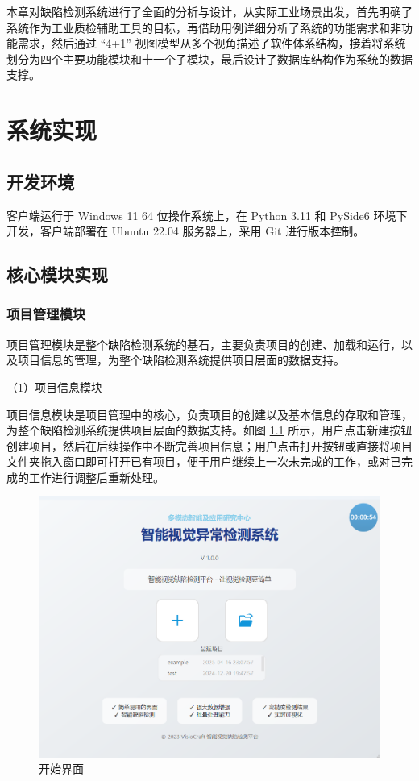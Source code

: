 \documentclass[
  ]{njuthesis}
\begin{document}
本章对缺陷检测系统进行了全面的分析与设计，从实际工业场景出发，首先明确了系统作为工业质检辅助工具的目标，再借助用例详细分析了系统的功能需求和非功能需求，然后通过 “4+1” 视图模型从多个视角描述了软件体系结构，接着将系统划分为四个主要功能模块和十一个子模块，最后设计了数据库结构作为系统的数据支撑。

\chapter{系统实现}

\section{开发环境}

客户端运行于 Windows 11 64 位操作系统上，在 Python 3.11 和 PySide6 环境下开发，客户端部署在 Ubuntu 22.04 服务器上，采用 Git 进行版本控制。

\section{核心模块实现}

\subsection{项目管理模块}

项目管理模块是整个缺陷检测系统的基石，主要负责项目的创建、加载和运行，以及项目信息的管理，为整个缺陷检测系统提供项目层面的数据支持。

（1）项目信息模块

项目信息模块是项目管理中的核心，负责项目的创建以及基本信息的存取和管理，为整个缺陷检测系统提供项目层面的数据支持。如图 \ref{开始界面} 所示，用户点击新建按钮创建项目，然后在后续操作中不断完善项目信息；用户点击打开按钮或直接将项目文件夹拖入窗口即可打开已有项目，便于用户继续上一次未完成的工作，或对已完成的工作进行调整后重新处理。

\begin{figure}[htb]
    \centering
    \includegraphics[width=\textwidth]{images/开始界面.png}
    \caption{开始界面}
    \label{开始界面}
\end{figure}
\end{document}
